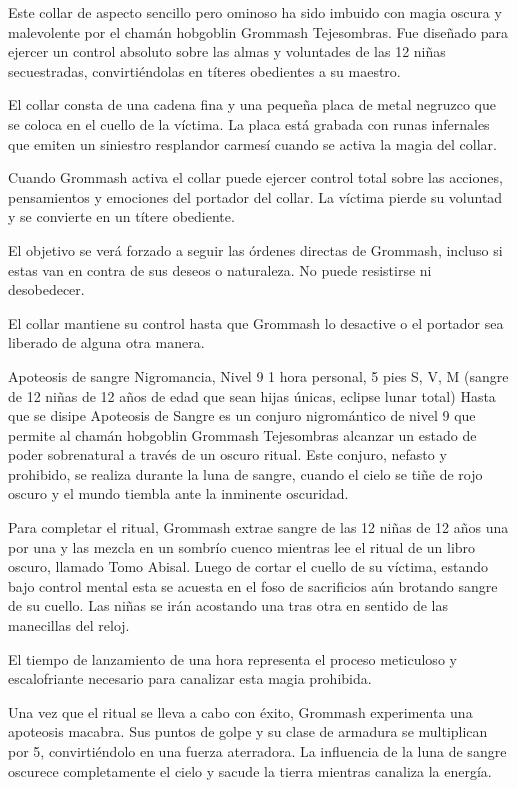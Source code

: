 \documentclass[10pt,twoside,twocolumn,openany]{dndbook}
\begin{document}
Este collar de aspecto sencillo pero ominoso ha sido imbuido con magia oscura y malevolente por el 
chamán hobgoblin Grommash Tejesombras. Fue diseñado para ejercer un control absoluto sobre las 
almas y voluntades de las 12 niñas secuestradas, convirtiéndolas en títeres obedientes a su 
maestro.

El collar consta de una cadena fina y una pequeña placa de metal negruzco que se coloca en el 
cuello de la víctima. La placa está grabada con runas infernales que emiten un siniestro 
resplandor carmesí cuando se activa la magia del collar.

Cuando Grommash activa el collar puede ejercer control total sobre las acciones, pensamientos 
y emociones del portador del collar. La víctima pierde su voluntad y se convierte en un títere 
obediente.

El objetivo se verá forzado a seguir las órdenes directas de Grommash, incluso si estas van en 
contra de sus deseos o naturaleza. No puede resistirse ni desobedecer.

El collar mantiene su control hasta que Grommash lo desactive o el portador sea liberado de alguna 
otra manera.

\DndSpellHeader%
{Apoteosis de sangre}
{Nigromancia, Nivel 9}
{1 hora}
{personal, 5 pies}
{S, V, M (sangre de 12 niñas de 12 años de edad que sean hijas únicas, eclipse lunar total)}
{Hasta que se disipe}
Apoteosis de Sangre es un conjuro nigromántico de nivel 9 que permite al chamán hobgoblin 
Grommash Tejesombras alcanzar un estado de poder sobrenatural a través de un oscuro ritual. Este 
conjuro, nefasto y prohibido, se realiza durante la luna de sangre, cuando el cielo se tiñe de 
rojo oscuro y el mundo tiembla ante la inminente oscuridad.

Para completar el ritual, Grommash extrae sangre de las 12 niñas de 12 años una por una y las 
mezcla en un sombrío cuenco mientras lee el ritual de un libro oscuro, llamado Tomo Abisal. Luego 
de cortar el cuello de su víctima, estando bajo control mental esta se acuesta en el foso de 
sacrificios aún brotando sangre de su cuello. Las niñas se irán acostando una tras otra en sentido 
de las manecillas del reloj.

El tiempo de lanzamiento de una hora representa el proceso meticuloso y escalofriante necesario 
para canalizar esta magia prohibida.

Una vez que el ritual se lleva a cabo con éxito, Grommash experimenta una apoteosis macabra. Sus 
puntos de golpe y su clase de armadura se multiplican por 5, convirtiéndolo en una fuerza 
aterradora. La influencia de la luna de sangre oscurece completamente el cielo y sacude la tierra 
mientras canaliza la energía.
\end{document}
